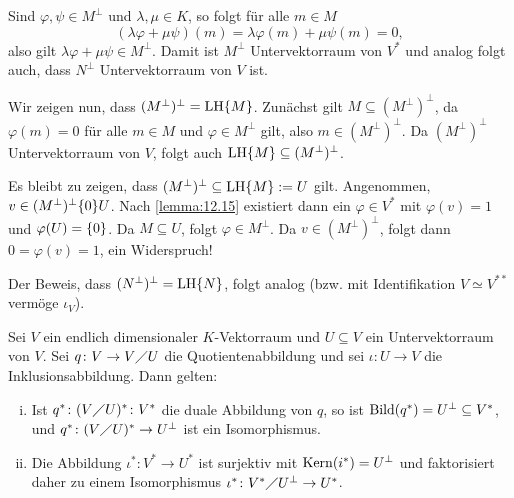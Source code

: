\begin{beweis}
	Sind $\varphi, \psi \in M^\perp$ und $\lambda, \mu \in K$, so folgt für alle $m \in M$
	\[
	(\lambda \varphi + \mu \psi)(m) = \lambda \varphi(m) + \mu \psi(m) = 0,
	\]
	also gilt $\lambda \varphi + \mu \psi \in M^\perp$.
	Damit ist $M^\perp$ Untervektorraum von $V^*$ und analog folgt auch, dass $N^\perp$ Untervektorraum von $V$ ist.
	
	Wir zeigen nun, dass $(M^\perp)^\perp = \operatorname{LH}\{M\}$.
	Zunächst gilt $M \subseteq (M^\perp)^\perp$, da $\varphi(m) = 0$ für alle $m \in M$ und $\varphi \in M^\perp$ gilt, also $m \in (M^\perp)^\perp$.
	Da $(M^\perp)^\perp$ Untervektorraum von $V$, folgt auch $\operatorname{LH}\{M\} \subseteq (M^\perp)^\perp$.
	
	Es bleibt zu zeigen, dass $(M^\perp)^\perp \subseteq \operatorname{LH}\{M\} := U$ gilt.
	Angenommen, $v \in (M^\perp)^\perp \{0\} U$.
	Nach \autoref{lemma:12.15} existiert dann ein $\varphi \in V^*$ mit $\varphi(v) = 1$ und $\varphi(U)=\{0\}$.
	Da $M \subseteq U$, folgt $\varphi \in M^\perp$.
	Da $v \in (M^\perp)^\perp$, folgt dann $0 = \varphi(v) = 1$, ein Widerspruch!
	
	Der Beweis, dass $(N^\perp)^\perp = \operatorname{LH} \{N\}$, folgt analog (bzw. mit Identifikation $V \simeq V^{**}$ vermöge $\iota_V$). \qedhere
\end{beweis}

\begin{satz}
	\label{satz:12.16}
	Sei $V$ ein endlich dimensionaler $K$-Vektorraum und $U \subseteq V$ ein Untervektorraum von $V$.
	Sei $q \colon V \rightarrow V \diagup U$ die Quotientenabbildung und sei $\iota \colon U \rightarrow V$ die Inklusionsabbildung.
	Dann gelten:
	\begin{enumerate}[(i)]
		\item Ist $q^*\colon (V \diagup U)^* \colon V^*$ die duale Abbildung von $q$, so ist $\operatorname{Bild}(q^*) = U^\perp \subseteq V^*$, und $q^*\colon (V \diagup U)^* \rightarrow U^\perp$ ist ein Isomorphismus.
		\item Die Abbildung $\iota^*\colon V^* \rightarrow U^*$ ist surjektiv mit $\operatorname{Kern}(i^*) = U^\perp$ und faktorisiert daher zu einem Isomorphismus $\iota^* \colon V^* \diagup U^\perp \rightarrow U^*$.
	\end{enumerate}
\end{satz}

